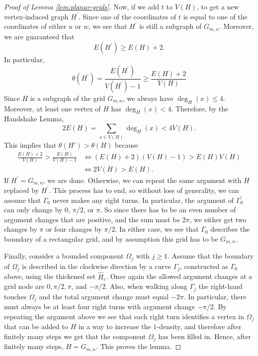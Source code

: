 \documentclass[10pt,a4paper]{amsart}
\newcommand{\Ga}{\Gamma }
\newcommand{\Om}{\Omega }
\newcommand{\ep}{\epsilon }
\begin{document}
\begin{proof}[Proof of Lemma \ref{lem:planar-grids}]
Now, if we add $t$ to $V(H)$, to get a new vertex-induced graph $H^\prime$. Since one of the coordinates of $t$ is equal to one of the coordinates of either $u$ or $w$, we see that $H^\prime$ is still a subgraph of $G_{m,n}$. Moreover, we are guaranteed that 
\[
E(H^\prime)\ge E(H)+2.
\] 
In particular,
\[
\theta(H^\prime)= \frac{E(H^\prime)}{V(H^\prime)-1}\ge\frac{E(H)+2}{V(H)}
\]
Since $H$ is a subgraph of the grid $G_{m,n}$, we always have $\deg_H(x)\le 4$. Moreover, at least one vertex of $H$ has $\deg_H(x)<4$. Therefore, by the Handshake Lemma,
\[
2E(H)=\sum_{x\in V(H)}\deg_H(x)<4 V(H).
\]
This implies that $\theta(H')>\theta(H)$ because
\begin{align*}
 \frac{E(H)+2}{V(H)} >\frac{E(H)}{V(H)-1}
& \Longleftrightarrow (E(H)+2)(V(H)-1)> E(H)V(H)\\
& \Longleftrightarrow 2V(H)> E(H).
\end{align*}
If $H^\prime=G_{m,n}$, we are done. Otherwise, we can repeat the same argument with $H$ replaced by $H^\prime$. This process has to end, so without loss of generality, we can assume that $\Ga_0$ never makes any right turns. In particular, the argument of $\Ga_0^\prime$ can only change by $0$, $\pi/2$, or $\pi$. So since there has to be an even number of argument changes that are positive, and the sum must be $2\pi$, we either get two changes by $\pi$ or four changes by $\pi/2$. In either case, we see that $\Ga_0$ describes the boundary of  a rectangular grid, and by assumption this grid has to be $G_{m,n}$.

Finally, consider a bounded component $\Om_j$ with $j\ge 1$. Assume that the boundary of $\Om_j$ is described in the clockwise direction by a curve $\Ga_j$, constructed as $\Ga_0$ above, using the thickened set $\hat{H}_\ep$. Once again the allowed argument changes at a grid node are $0,\pi/2,\pi$, and $-\pi/2$. Also, when walking along $\Ga_j$ the right-hand touches $\Om_j$ and the total argument change must equal $-2\pi$. In particular, there must always be at least four right turns with argument change $-\pi/2$. By repeating the argument above we see that each right turn identifies a vertex in $\Om_j$ that can be added to $H$ in a way to increase the $1$-density, and therefore after finitely many steps we get that the component $\Om_j$ has been filled in. Hence, after finitely many steps, $H=G_{m,n}$. This proves the lemma.
\end{proof}
\end{document}
